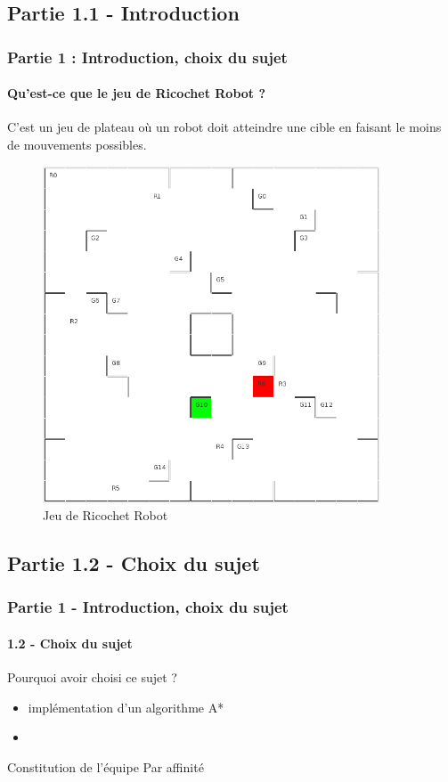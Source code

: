 \documentclass{beamer} %
\begin{document}
	\subsection{Partie 1.1 - Introduction}
\begin{frame}[plain]
\frametitle{Partie 1 : Introduction, choix du sujet}
\framesubtitle{Qu'est-ce que le jeu de Ricochet Robot ?}
C'est un jeu de plateau où un robot doit atteindre une cible en faisant le moins de mouvements possibles.
\begin{figure}
	\includegraphics[width=10cm]{images/visuBoard.png}
	\caption{Jeu de Ricochet Robot}
\end{figure}
\end{frame}

	\subsection{Partie 1.2 - Choix du sujet}
\begin{frame}[plain]
\frametitle{Partie 1 - Introduction, choix du sujet}
\framesubtitle{1.2 - Choix du sujet}
\begin{alertblock}{Pourquoi avoir choisi ce sujet ?}
	\begin{itemize}
		\item implémentation d'un algorithme A*
		\item 
	\end{itemize}
\end{alertblock}
\bigbreak
\begin{exampleblock}{Constitution de l'équipe}
Par affinité 
\end{exampleblock}
\end{frame}
\end{document}

